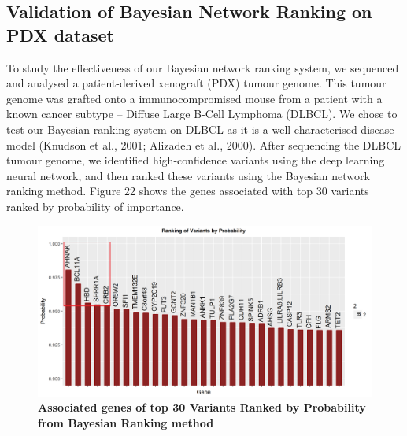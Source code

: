 \documentclass{article}
\begin{document}
\subsection{Validation of Bayesian Network Ranking on PDX dataset}
To study the effectiveness of our Bayesian network ranking system, we sequenced and analysed a patient-derived xenograft (PDX) tumour genome. This tumour genome was grafted onto a immunocompromised mouse from a patient with a known cancer subtype -- Diffuse Large B-Cell Lymphoma (DLBCL). We chose to test our Bayesian ranking system on DLBCL as it is a well-characterised disease model (Knudson et al., 2001; Alizadeh et al., 2000). After sequencing the DLBCL tumour genome, we identified high-confidence variants using the deep learning neural network, and then ranked these variants using the Bayesian network ranking method. Figure 22 shows the genes associated with top 30 variants ranked by probability of importance. 

\begin{figure}[H]
\includegraphics[width=\textwidth]{bayesianranks.png}
\caption{\textbf{Associated genes of top 30 Variants Ranked by Probability from Bayesian Ranking method}}
\centering
\end{figure}
\end{document}
